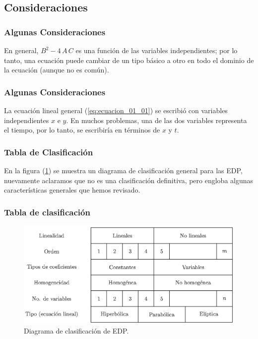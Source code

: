 \subsection*{Consideraciones}
\begin{frame}
\frametitle{Algunas Consideraciones}
En general, $B^{2} - 4 \, A \, C$ es una función de las variables independientes; por lo tanto, una ecuación puede cambiar de un tipo básico a otro en todo el dominio de la ecuación (aunque no es común).
\end{frame}
\begin{frame}
\frametitle{Algunas Consideraciones}
La ecuación lineal general (\ref{eq:ecuacion_01_01}) se escribió con variables independientes $x$ e $y$. En muchos problemas, una de las dos variables representa el tiempo, por lo tanto, se escribiría en términos de $x$ y $t$.
\end{frame}
\begin{frame}
\frametitle{Tabla de Clasificación}
En la figura (\ref{fig:figura_clasificacion_EDP}) se muestra un diagrama de clasificación general para las EDP, nuevamente aclaramos que no es una clasificación definitiva, pero engloba algunas características generales que hemos revisado.
\end{frame}
\begin{frame}
\frametitle{Tabla de clasificación}
\begin{figure}[H]
    \centering
    \includegraphics[scale=0.87]{Imagenes/Cuadro_Clasificacion_EDP.eps}
    \caption{Diagrama de clasificación de EDP.}
    \label{fig:figura_clasificacion_EDP}
\end{figure}
\end{frame}

